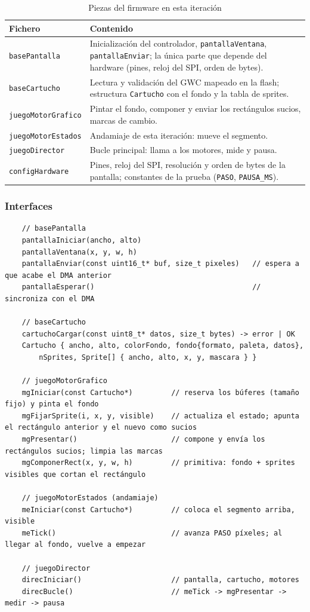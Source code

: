 \begin{table}[H]
	\centering
	\begin{tabular}{lp{8.5cm}}
		\toprule
		Fichero & Contenido \\
		\midrule
		\texttt{basePantalla} & Inicialización del controlador, \texttt{pantallaVentana}, \texttt{pantallaEnviar}; la única parte que depende del hardware (pines, reloj del SPI, orden de bytes). \\
		\texttt{baseCartucho} & Lectura y validación del GWC mapeado en la flash; estructura \texttt{Cartucho} con el fondo y la tabla de sprites. \\
		\texttt{juegoMotorGrafico} & Pintar el fondo, componer y enviar los rectángulos sucios, marcas de cambio. \\
		\texttt{juegoMotorEstados} & Andamiaje de esta iteración: mueve el segmento. \\
		\texttt{juegoDirector} & Bucle principal: llama a los motores, mide y pausa. \\
		\texttt{configHardware} & Pines, reloj del SPI, resolución y orden de bytes de la pantalla; constantes de la prueba (\texttt{PASO}, \texttt{PAUSA\_MS}). \\
		\bottomrule
	\end{tabular}
	\caption{Piezas del firmware en esta iteración}
	\label{tab:F6I02Ficheros}
\end{table}

\subsubsection{Interfaces}

\begin{verbatim}
	// basePantalla
	pantallaIniciar(ancho, alto)
	pantallaVentana(x, y, w, h)
	pantallaEnviar(const uint16_t* buf, size_t pixeles)   // espera a que acabe el DMA anterior
	pantallaEsperar()                                     // sincroniza con el DMA
	
	// baseCartucho
	cartuchoCargar(const uint8_t* datos, size_t bytes) -> error | OK
	Cartucho { ancho, alto, colorFondo, fondo{formato, paleta, datos},
		nSprites, Sprite[] { ancho, alto, x, y, mascara } }
	
	// juegoMotorGrafico
	mgIniciar(const Cartucho*)         // reserva los búferes (tamaño fijo) y pinta el fondo
	mgFijarSprite(i, x, y, visible)    // actualiza el estado; apunta el rectángulo anterior y el nuevo como sucios
	mgPresentar()                      // compone y envía los rectángulos sucios; limpia las marcas
	mgComponerRect(x, y, w, h)         // primitiva: fondo + sprites visibles que cortan el rectángulo
	
	// juegoMotorEstados (andamiaje)
	meIniciar(const Cartucho*)         // coloca el segmento arriba, visible
	meTick()                           // avanza PASO píxeles; al llegar al fondo, vuelve a empezar
	
	// juegoDirector
	direcIniciar()                     // pantalla, cartucho, motores
	direcBucle()                       // meTick -> mgPresentar -> medir -> pausa
\end{verbatim}

